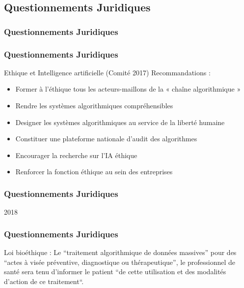 \subsection{Questionnements Juridiques}

\begin{frame}
  \frametitle{Questionnements Juridiques}
\end{frame}

\begin{frame}
  \frametitle{Questionnements Juridiques}
  Ethique et Intelligence artificielle (Comité 2017)
  Recommandations :
  \begin{itemize}
  \item Former à l’éthique tous les acteurs-maillons de la « chaîne algorithmique » 
  \item Rendre les systèmes algorithmiques compréhensibles
  \item Designer les systèmes algorithmiques au service de la liberté humaine
  \item Constituer une plateforme nationale d’audit des algorithmes
  \item Encourager la recherche sur l’IA éthique
  \item Renforcer la fonction éthique au sein des entreprises
  \end{itemize}
\end{frame}

\begin{frame}
  \frametitle{Questionnements Juridiques}
  2018
\end{frame}

\begin{frame}
  \frametitle{Questionnements Juridiques}
  Loi bioéthique :
  Le ``traitement algorithmique de données massives'' pour des ``actes à visée préventive, diagnostique ou thérapeutique'', le professionnel de santé sera tenu d'informer le patient ``de cette utilisation et des modalités d’action de ce traitement``.
\end{frame}
